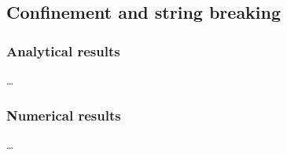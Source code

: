 \documentclass[../main.tex]{subfiles} %
\begin{document}
\subsection{Confinement and string breaking} \label{sec:ConfienementAndStringBreakingAnalyticalAndNumerical}

\subsubsection{Analytical results}

\ldots



\subsubsection{Numerical results}

\ldots
\end{document}
